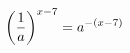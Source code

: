 \documentclass[preview]{standalone}
\begin{document}
\begin{align*}
\special{dvisvgm:raw <g id='unique000'>}\left(\frac{1}{a}\right)^{x-7} = a^{-(x-7)}\special{dvisvgm:raw </g>}
\end{align*}
\end{document}
